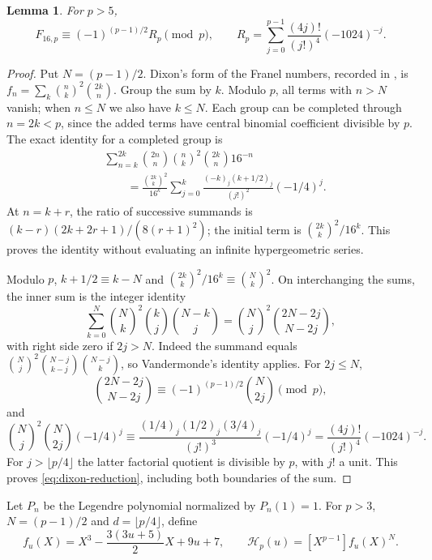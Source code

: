 \documentclass[11pt,a4paper]{article}
\newtheorem{lemma}[theorem]{Lemma}
\theoremstyle{remark}
\begin{document}
\begin{lemma}\label{lem:dixon}
For $p>5$,
\begin{equation}\label{eq:dixon-reduction}
 F_{16,p}\equiv(-1)^{(p-1)/2} R_p\pmod p,\qquad
 R_p=\sum_{j=0}^{p-1}\frac{(4j)!}{(j!)^4}(-1024)^{-j}.
\end{equation}
\end{lemma}
\begin{proof}
Put $N=(p-1)/2$.
Dixon's form of the Franel numbers, recorded in
\cite[p.~2729]{sun}, is $f_n=\sum_k\binom nk^2\binom{2k}n$.
Group the sum by $k$. Modulo $p$, all terms with $n>N$ vanish;
when $n\le N$ we also have $k\le N$. Each group can be completed
through $n=2k<p$, since the added terms have central binomial
coefficient divisible by $p$. The exact identity for a completed
group is
\[
\begin{split}
 &\sum_{n=k}^{2k}\binom{2n}n\binom nk^2\binom{2k}n16^{-n}\\
 &\qquad=\frac{\binom{2k}k^2}{16^k}
       \sum_{j=0}^k\frac{(-k)_j(k+1/2)_j}{(j!)^2}(-1/4)^j.
\end{split}
\]
At $n=k+r$, the ratio of successive summands is
$(k-r)(2k+2r+1)/(8(r+1)^2)$; the initial term is
$\binom{2k}k^2/16^k$. This proves the identity without evaluating
an infinite hypergeometric series.

Modulo $p$, $k+1/2\equiv k-N$ and
$\binom{2k}k^2/16^k\equiv\binom Nk^2$. On interchanging the sums,
the inner sum is the integer identity
\begin{equation}\label{eq:vandermonde}
 \sum_{k=0}^N\binom Nk^2\binom kj\binom{N-k}j
 =\binom Nj^2\binom{2N-2j}{N-2j},
\end{equation}
with right side zero if $2j>N$. Indeed the summand equals
$\binom Nj^2\binom{N-j}{k-j}\binom{N-j}k$, so Vandermonde's
identity applies. For $2j\le N$,
\[
 \binom{2N-2j}{N-2j}\equiv(-1)^{(p-1)/2}\binom N{2j}\pmod p,
\]
and
\[
 \binom Nj^2\binom N{2j}(-1/4)^j
 \equiv\frac{(1/4)_j(1/2)_j(3/4)_j}{(j!)^3}(-1/4)^j
 =\frac{(4j)!}{(j!)^4}(-1024)^{-j}.
\]
For $j>\lfloor p/4\rfloor$ the latter factorial quotient is
divisible by $p$, with $j!$ a unit. This proves
\eqref{eq:dixon-reduction}, including both boundaries of the sum.
\end{proof}

Let $P_n$ be the Legendre polynomial normalized by $P_n(1)=1$.
For $p>3$, $N=(p-1)/2$ and $d=\lfloor p/4\rfloor$, define
\begin{equation}\label{eq:hasse-definition}
 f_u(X)=X^3-\frac{3(3u+5)}2X+9u+7,
 \qquad\mathcal H_p(u)=[X^{p-1}]f_u(X)^N.
\end{equation}
\end{document}
